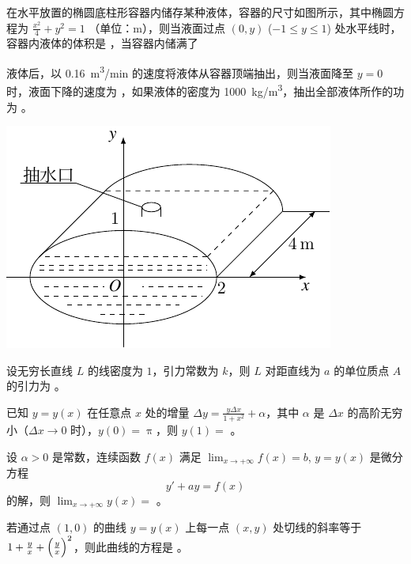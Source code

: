 \begin{ti}
	在水平放置的椭圆底柱形容器内储存某种液体，容器的尺寸如图所示，其中椭圆方程为 $\frac{x^2}{4} + y^2 = 1$ （单位：\si{m}），则当液面过点 $(0,y)$ ($-1 \leq y \leq 1$) 处水平线时，容器内液体的体积是 \hua，当容器内储满了
	\parbox[t]{0.4\textwidth}{\vspace{0pt}
	液体后，以 \SI{0.16}{m^3/min} 的速度将液体从容器顶端抽出，则当液面降至 $y = 0$ 时，液面下降的速度为 \hua，如果液体的密度为 \SI{1000}{kg/m^3}，抽出全部液体所作的功为 \hua。
	}%
	\begin{varwidth}[t]{\textwidth}
		\vspace{0pt}\includegraphics{figure/fig74.pdf}
	\end{varwidth}
\end{ti}

\begin{ti}
	设无穷长直线 $L$ 的线密度为 $1$，引力常数为 $k$，则 $L$ 对距直线为 $a$ 的单位质点 $A$ 的引力为 \hua。
\end{ti}

\begin{ti}
	已知 $y = y(x)$ 在任意点 $x$ 处的增量 $\Delta y = \frac{y \Delta x}{1 + x^2} + \alpha$，其中 $\alpha$ 是 $\Delta x$ 的高阶无穷小（$\Delta x \to 0$ 时），$y(0) = \uppi$，则 $y(1) = $ \hua。
\end{ti}

\begin{ti}
	设 $\alpha > 0$ 是常数，连续函数 $f(x)$ 满足 $\lim_{x \to +\infty} f(x) = b$, $y = y(x)$ 是微分方程
	\[
		y' + ay = f(x)
	\]
	的解，则 $\lim_{x \to +\infty} y(x) = $ \hua。
\end{ti}

\begin{ti}
	若通过点 $(1,0)$ 的曲线 $y = y(x)$ 上每一点 $(x,y)$ 处切线的斜率等于 $1 + \frac{y}{x} + \Bigl( \frac{y}{x} \Bigr)^2$，则此曲线的方程是 \hua。
\end{ti}

